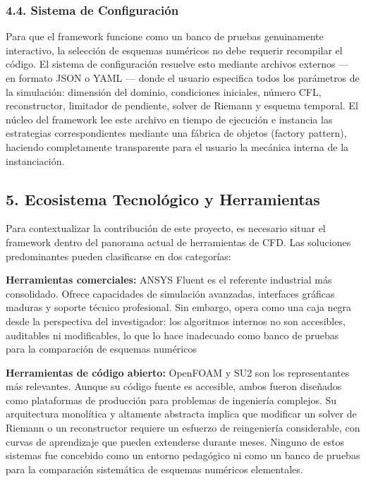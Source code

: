\documentclass[11pt,openany]{book}
\begin{document}
\subsubsection{4.4. Sistema de Configuración}\textbf{}

Para que el framework funcione como un banco de pruebas genuinamente interactivo, la selección de esquemas numéricos no debe requerir recompilar el código. El sistema de configuración resuelve esto mediante archivos externos — en formato JSON o YAML — donde el usuario especifica todos los parámetros de la simulación: dimensión del dominio, condiciones iniciales, número CFL, reconstructor, limitador de pendiente, solver de Riemann y esquema temporal. El núcleo del framework lee este archivo en tiempo de ejecución e instancia las estrategias correspondientes mediante una fábrica de objetos (factory pattern), haciendo completamente transparente para el usuario la mecánica interna de la instanciación.

\subsection{5. Ecosistema Tecnológico y Herramientas}

Para contextualizar la contribución de este proyecto, es necesario situar el framework dentro del panorama actual de herramientas de CFD. Las soluciones predominantes pueden clasificarse en dos categorías:

\textbf{Herramientas comerciales: }ANSYS Fluent es el referente industrial más consolidado. Ofrece capacidades de simulación avanzadas, interfaces gráficas maduras y soporte técnico profesional. Sin embargo, opera como una caja negra desde la perspectiva del investigador: los algoritmos internos no son accesibles, auditables ni modificables, lo que lo hace inadecuado como banco de pruebas para la comparación de esquemas numéricos \parencite{raman2018review}

\textbf{Herramientas de código abierto: }OpenFOAM \parencite{jasak2009openfoam} y SU2 son los representantes más relevantes. Aunque su código fuente es accesible, ambos fueron diseñados como plataformas de producción para problemas de ingeniería complejos. Su arquitectura monolítica y altamente abstracta implica que modificar un solver de Riemann o un reconstructor requiere un esfuerzo de reingeniería considerable, con curvas de aprendizaje que pueden extenderse durante meses. Ninguno de estos sistemas fue concebido como un entorno pedagógico ni como un banco de pruebas para la comparación sistemática de esquemas numéricos elementales.
\end{document}
